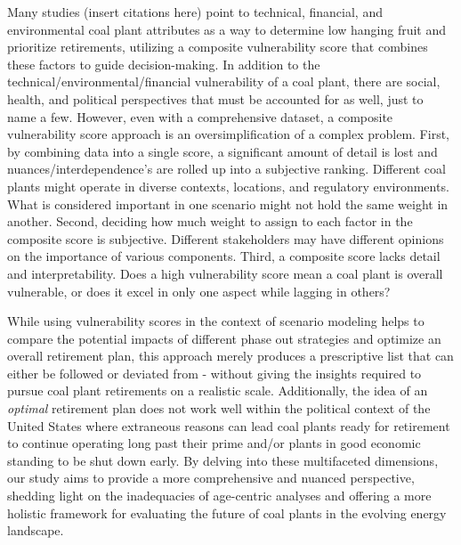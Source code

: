 Many studies (insert citations here) point to technical, financial, and environmental 
coal plant attributes as a way to determine low hanging fruit and prioritize retirements, utilizing a composite vulnerability score that combines these factors to guide 
decision-making. In addition to the technical/environmental/financial vulnerability of a coal plant, there are social, health, and political perspectives that must be accounted for as well, just 
to name a few. However, even with a comprehensive dataset, a composite vulnerability score approach is an oversimplification of a complex problem.
First, by combining data into a single score, a significant amount of detail is lost and nuances/interdependence's are rolled up into a subjective 
ranking. Different coal plants might operate in diverse contexts, locations, and regulatory environments. What is considered important in 
one scenario might not hold the same weight in another. Second, deciding how much weight to assign to each factor in the composite score is subjective. Different stakeholders may have 
different opinions on the importance of various components. Third, a composite score lacks detail and interpretability. Does a high vulnerability score mean a coal plant is 
overall vulnerable, or does it excel in only one aspect while lagging in others?

While using vulnerability scores in the context of scenario modeling helps to compare the potential impacts of different phase out strategies and 
optimize an overall retirement plan, this approach merely produces a prescriptive list that can either be followed or deviated from - without giving 
the insights required to pursue coal plant retirements on a realistic scale. Additionally, the idea of an \textit{optimal} retirement plan does not work well 
within the political context of the United States where extraneous reasons can lead coal plants ready for retirement to continue operating long 
past their prime and/or plants in good economic standing to be shut down early. By delving into these multifaceted dimensions, our study aims to provide a 
more comprehensive and nuanced perspective, shedding light on the inadequacies of age-centric analyses and offering a more holistic 
framework for evaluating the future of coal plants in the evolving energy landscape.

